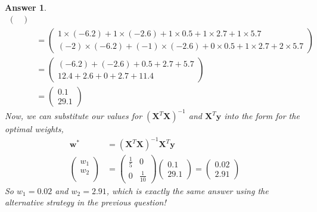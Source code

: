 \documentclass{article}
\newtheorem{answer}{Answer}
\newcommand{\bracket}[3]{\left#1 #3 \right#2}
\renewcommand{\b}{\bracket{(}{)}}
\newcommand{\y}{\mathbf{y}}
\newcommand{\X}{\mathbf{X}}
\newcommand{\w}{\mathbf{w}}
\newcommand{\wo}{\w^*}
\begin{document}
\begin{answer}
\begin{align}
\begin{pmatrix}
    \end{pmatrix}\\
    &=
    \begin{pmatrix}
      {1 {\times} (-6.2) + 1 {\times} (-2.6) + 1 {\times} 0.5 + 1 {\times} 2.7 + 1{\times} 5.7}\\
      {(-2) {\times} (-6.2) + (-1) {\times} (-2.6) + 0 {\times} 0.5 + 1 {\times} 2.7 + 2{\times} 5.7}
    \end{pmatrix}\\
    &=
    \begin{pmatrix}
      {(-6.2) + (-2.6) + 0.5 + 2.7 + 5.7}\\
      {12.4 + 2.6 + 0 + 2.7 + 11.4}
    \end{pmatrix}\\
    &= 
    \begin{pmatrix}
      0.1\\
      29.1
    \end{pmatrix}
  \end{align}
  Now, we can substitute our values for $\b{\X^T \X}^{-1}$ and $\X^T \y$ into the form for the optimal weights,
  \begin{align}
    \wo &= \b{\X^T \X}^{-1} \X^T \y\\
    \begin{pmatrix}
      w_1\\
      w_2\\
    \end{pmatrix} &= 
    \begin{pmatrix} \tfrac{1}{5} & 0 \\ 0 & \tfrac{1}{10} \end{pmatrix}
    \begin{pmatrix}
      0.1\\
      29.1
    \end{pmatrix}
    = 
    \begin{pmatrix}
      0.02\\
      2.91
    \end{pmatrix}
  \end{align}
  So $w_1 = 0.02$ and $w_2 = 2.91$, which is exactly the same answer using the alternative strategy in the previous question!
\end{answer}
\end{document}
